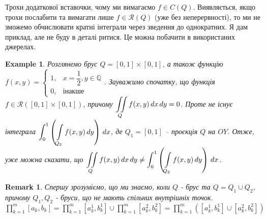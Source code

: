 \documentclass[a4paper, 10pt]{article}
\theoremstyle{theoremdd}
\theoremstyle{theoremdd}
\theoremstyle{theoremdd}
\theoremstyle{theoremdd}
\newtheorem{example}[theorem]{Example}
\theoremstyle{theoremdd}
\theoremstyle{theoremdd}
\newtheorem{remark}[theorem]{Remark}
\theoremstyle{theoremdd}
\theoremstyle{theoremdd}
\begin{document}
\noindent
Трохи додаткової вставочки, чому ми вимагаємо $f \in C(Q)$. Виявляється, якщо трохи послабити та вимагати лише $f \in \mathcal{R}(Q)$ (уже без неперервності), то ми не зможемо обчислювати кратні інтеграли через зведення до однократних. Я дам приклад, але не буду в деталі ритися. Це можна побачити в використаних джерелах.

\begin{example}
Розглянемо брус $Q = [0,1] \times [0,1]$, а також функцію $f(x,y) = \begin{cases} 1, & x = \dfrac{1}{2}, y \in \mathbb{Q} \\ 0, & \text{інакше} \end{cases}$. Зауважимо спочатку, що функція $f \in \mathcal{R}([0,1] \times [0,1])$, причому $\displaystyle\iint\displaylimits_Q f(x,y)\,dx\,dy = 0$. Проте не існує інтеграла $\displaystyle\int_0^1 \left( \int\displaylimits_{Q_2} f(x,y)\,dy \right)\,dx$, де $Q_1 = [0,1]$ -- проєкція $Q$ на $OY$. Отже, уже можна сказати, що $\displaystyle\iint\displaylimits_Q f(x,y)\,dx\,dy \neq \int_0^1 \left( \int\displaylimits_{Q_2} f(x,y)\,dy \right)\,dx$. 
\end{example}

\iffalse
\begin{remark}
Пояснення нерівності $\overset{?}{\leq}$ під час доведення наведу на просішому прикладі, на $\mathbb{R}^2$.\\
$U(f,\lambda) \geq \displaystyle\sum_{\substack{0 \leq v_1 \leq n_1-1 \\ 0 \leq v_2 \leq n_2-1}} \sup_{(x,y) \in Q(v_1,v_2)} f(x,y) \Delta x(v_1) \Delta y(v_2) = \sum_{v_2=0}^{n_2-1} \left( \sum_{v_1=0}^{n_1-1} \sup_{(x,y) \in Q(v_1,v_2)} f(x,y) \Delta x(v_1) \right) \Delta y(v_2)$
\end{remark}
\fi

\iffalse
\begin{remark}
Спершу зрозуміємо, що ми знаємо, коли $Q$ - брус та $Q = Q_1 \cup Q_2$, причому $Q_1,Q_2$ - бруси, що не мають спільних внутрішніх точок.\\
$\displaystyle\prod_{k=1}^m [a_k,b_k] = \prod_{k=1}^m [a_k^1,b_k^1] \cup \prod_{k=1}^m [a_k^2,b_k^2] = \prod_{k=1}^m ([a_k^1,b_k^1] \cup [a_k^2,b_k^2])$
\end{remark}
\end{document}
